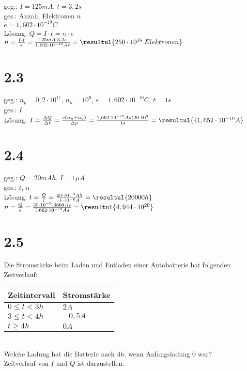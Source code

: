 \documentclass{scrreprt}
\begin{document}
geg.: $I=125mA$, $t=3,2s$\\
ges.: Anzahl Elektronen $n$\\
$e = 1,602 \cdot 10^{-19}C$\\
Lösung: $Q=I\cdot t=n\cdot e$\\
$n=\frac{I\cdot t}{e}=\frac{125mA \cdot 3,2s}{1,602\cdot 10^{-19}As}=\resultul{250\cdot 10^{16}\; Elektronen}$

\section*{2.3}

geg.: $n_p=0,2\cdot 10^{11}$, $n_n=10^9$, $e=1,602\cdot 10^{-10} C$, $t=1s$\\
ges.: $I$\\
Lösung: $I=\frac{\Delta Q}{\Delta t}=\frac{e(n_n+n_p)}{\Delta p}=\frac{1,602\cdot 10^{-19}As(26\cdot 10^9}{1s}=\resultul{41,652 \cdot 10^{-10}A}$

\section*{2.4}

geg.: $Q=20mAh$, $I=1 \mu A$\\
ges.: $t$, $n$\\
Lösung: $t=\frac{Q}{I}=\frac{20\cdot 10^{-3}Ah}{1 \cdot 10^{-6}A}=\resultul{20000h}$\\
$n=\frac{Q}{e}=\frac{20\cdot 10^{-3}\cdot 3600 As}{1,602\cdot 10^{-19} As}=\resultul{4,944\cdot 10^{20}}$

\section*{2.5}
Die Stromstärke beim Laden und Entladen einer Autobatterie hat folgenden Zeitverlauf:\\
\begin{tabular}{l | l}
Zeitintervall & Stromstärke \\
\hline
$0 \leq t < 3h$ & $2A$\\
$3 \leq t < 4h$ & $-0,5A$\\
$t\geq 4h$ & $0A$
\end{tabular}\\
Welche Ladung hat die Batterie nach $4h$, wenn Anfangsladung $0$ war?\\
Zeitverlauf von $I$ und $Q$ ist darzustellen.
\end{document}
